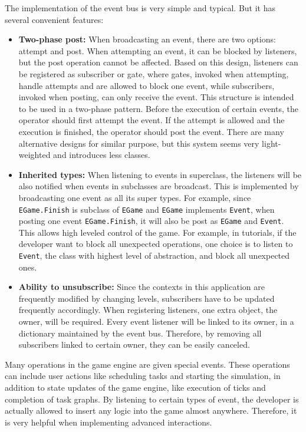 \documentclass[msc,deptreport, cs]{infthesis}
\begin{document}
The implementation of the event bus is very simple and typical. But it has several convenient features:
\begin{itemize}
  \item \textbf{Two-phase post:} When broadcasting an event, there are two options: attempt and post. When attempting an event, it can be blocked by listeners, but the post operation cannot be affected. Based on this design, listeners can be registered as subscriber or gate, where gates, invoked when attempting, handle attempts and are allowed to block one event, while subscribers, invoked when posting, can only receive the event. This structure is intended to be used in a two-phase pattern. Before the execution of certain events, the operator should first attempt the event. If the attempt is allowed and the execution is finished, the operator should post the event. There are many alternative designs for similar purpose, but this system seems very light-weighted and introduces less classes.
  \item \textbf{Inherited types:} When listening to events in superclass, the listeners will be also notified when events in subclasses are broadcast. This is implemented by broadcasting one event as all its super types. For example, since \verb+EGame.Finish+ is subclass of \verb+EGame+ and \verb+EGame+ implements \verb+Event+, when posting one event \verb+EGame.Finish+, it will also be post as \verb+EGame+ and \verb+Event+. This allows high leveled control of the game. For example, in tutorials, if the developer want to block all unexpected operations, one choice is to listen to \verb+Event+, the class with highest level of abstraction, and block all unexpected ones.
  \item \textbf{Ability to unsubscribe:} Since the contexts in this application are frequently modified by changing levels, subscribers have to be updated frequently accordingly. When registering listeners, one extra object, the owner, will be required. Every event listener will be linked to its owner, in a dictionary maintained by the event bus. Therefore, by removing all subscribers linked to certain owner, they can be easily canceled.
\end{itemize}

Many operations in the game engine are given special events. These operations can include user actions like scheduling tasks and starting the simulation, in addition to state updates of the game engine, like execution of ticks and completion of task graphs. By listening to certain types of event, the developer is actually allowed to insert any logic into the game almost anywhere. Therefore, it is very helpful when implementing advanced interactions.
\end{document}

